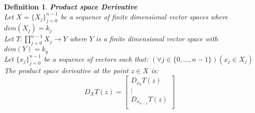 \documentclass[12pt]{extarticle}
\theoremstyle{plain}
\theoremstyle{Definition}
\newtheorem{def.}{Definition}[section]
\theoremstyle{Definition}
\theoremstyle{plain}
\begin{document}
\begin{def.} \textbf{Product space Derivative} \\ 
		Let $X = \{X_j\}_{j=0}^{n-1}$ be a sequence of finite dimensional vector spaces where $dim(X_j) = k_j$ \\ 
		Let $T : \prod_{j=0}^{n-1} X_j \to Y$ where $Y$ is a finite dimensional vector space with $dim(Y) = k_y$ \\
		Let $\{x_j\}_{j=0}^{n-1}$ be a sequence of vectors such that: $(\forall j \in \{0,...,n-1\})(x_j \in X_j)$ \\ 
		The product space derivative at the point $z \in X$ is: \\ 
		\[
		D_{X} T(z) = 
		\begin{bmatrix}
		D_{x_0} T(z) \\ 
		\vdots \\ 
		D_{x_{n-1}} T(z) \\ 		
		\end{bmatrix}
		\]
\end{def.}
\end{document}
